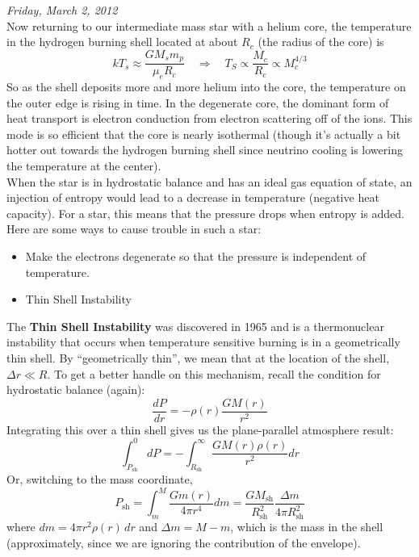\documentclass[10pt]{article}
\numberwithin{equation}{section}
\newcommand{\n}{\noindent}
\begin{document}
    \n \textit{Friday, March 2, 2012}\\

    \n Now returning to our intermediate mass star with a helium
    core, the temperature in the hydrogen burning shell located at
    about $R_c$ (the radius of the core) is
    \begin{equation}
      \label{eq:282}
      kT_s\approx\frac{G M_sm_p}{\mu_e R_c}\quad\Rightarrow \quad
      T_S\propto \frac{M_c}{R_c}\propto M_c^{4/3}
    \end{equation}
    So as the shell deposits more and more helium into the core, the
    temperature on the outer edge is rising in time. In the degenerate 
core,
    the dominant form of heat transport is electron conduction from
    electron scattering off of the ions. This mode is so efficient
    that the core is nearly isothermal (though it's actually a bit
    hotter out towards the hydrogen burning shell since neutrino
    cooling is lowering the temperature at the center).\\

    \n When the star is in hydrostatic balance and has an ideal gas
    equation of state, an injection of entropy would lead to a decrease in
    temperature (negative heat capacity). For a star, this means that
    the pressure drops when entropy is added. Here are some ways to
    cause trouble in such a star:
    \begin{itemize}
    \item Make the electrons degenerate so that the pressure is
      independent of temperature. 
    \item Thin Shell Instability
    \end{itemize}
    The \textbf{Thin Shell Instability} was discovered in 1965 and is
    a thermonuclear instability that occurs when temperature sensitive
    burning is in a geometrically thin shell. By ``geometrically
    thin'', we mean that at the location of the shell, $\Delta r\ll
    R$. To get a better handle on this mechanism, recall the condition
    for hydrostatic balance (again):
    \begin{equation}
      \label{eq:283}
      \frac{dP}{dr}=-\rho(r)\frac{GM(r)}{r^2}
    \end{equation}
    Integrating this over a thin shell gives us the plane-parallel
    atmosphere result:
    \begin{equation}
      \label{eq:284}
      \int_{P_{\mathrm{sh}}}^0dP=-\int_{R_{\mathrm{sh}}}^\infty
      \frac{GM(r) \rho(r)}{r^2}dr
    \end{equation}
    Or, switching to the mass coordinate,
    \begin{equation}
      \label{eq:285}
      P_{\mathrm{sh}}=\int_m^M\frac{Gm(r)}{4\pi r^4}dm=\frac{G
        M_{\mathrm{sh}}}{R_{\mathrm{sh}}^2}\frac{\Delta m}{4\pi R_{\mathrm
{sh}}^2}
    \end{equation}
    where $dm=4\pi r^2 \rho(r)\,dr$ and $\Delta m= M-m$, which is
    the mass in the shell (approximately, since we are ignoring the
    contribution of the envelope).\\
\end{document}
